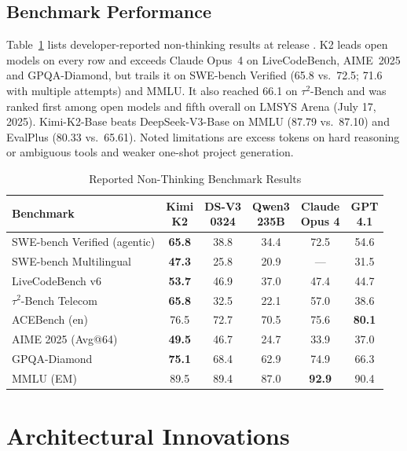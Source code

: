 \documentclass[10pt,twocolumn,letterpaper]{article}
\begin{document}
\subsection{Benchmark Performance}
Table~\ref{tab:bench} lists developer-reported non-thinking results at release \cite{kimik2}. K2 leads open models on every row and exceeds Claude Opus~4 on LiveCodeBench, AIME~2025 and GPQA-Diamond, but trails it on SWE-bench Verified (65.8 vs.\ 72.5; 71.6 with multiple attempts) and MMLU. It also reached 66.1 on $\tau^2$-Bench and was ranked first among open models and fifth overall on LMSYS Arena (July 17, 2025). Kimi-K2-Base beats DeepSeek-V3-Base on MMLU (87.79 vs.\ 87.10) and EvalPlus (80.33 vs.\ 65.61). Noted limitations are excess tokens on hard reasoning or ambiguous tools and weaker one-shot project generation.

\begin{table}[!t]
\caption{Reported Non-Thinking Benchmark Results \cite{kimik2}}
\label{tab:bench}
\centering\footnotesize
\setlength{\tabcolsep}{2.6pt}
\begin{tabular}{lccccc}
\toprule
Benchmark & \makecell{Kimi\\K2} & \makecell{DS-V3\\0324} & \makecell{Qwen3\\235B} & \makecell{Claude\\Opus 4} & \makecell{GPT\\4.1} \\
\midrule
SWE-bench Verified (agentic) & \textbf{65.8} & 38.8 & 34.4 & 72.5 & 54.6 \\
SWE-bench Multilingual & \textbf{47.3} & 25.8 & 20.9 & --- & 31.5 \\
LiveCodeBench v6 & \textbf{53.7} & 46.9 & 37.0 & 47.4 & 44.7 \\
$\tau^2$-Bench Telecom & \textbf{65.8} & 32.5 & 22.1 & 57.0 & 38.6 \\
ACEBench (en) & 76.5 & 72.7 & 70.5 & 75.6 & \textbf{80.1} \\
AIME 2025 (Avg@64) & \textbf{49.5} & 46.7 & 24.7 & 33.9 & 37.0 \\
GPQA-Diamond & \textbf{75.1} & 68.4 & 62.9 & 74.9 & 66.3 \\
MMLU (EM) & 89.5 & 89.4 & 87.0 & \textbf{92.9} & 90.4 \\
\bottomrule
\end{tabular}
\end{table}

\section{Architectural Innovations}
\end{document}
